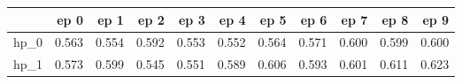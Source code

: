 \begin{tabular}{lrrrrrrrrrr}
\toprule
{} &   ep 0 &   ep 1 &   ep 2 &   ep 3 &   ep 4 &   ep 5 &   ep 6 &   ep 7 &   ep 8 &   ep 9 \\
\midrule
hp\_0 &  0.563 &  0.554 &  0.592 &  0.553 &  0.552 &  0.564 &  0.571 &  0.600 &  0.599 &  0.600 \\
hp\_1 &  0.573 &  0.599 &  0.545 &  0.551 &  0.589 &  0.606 &  0.593 &  0.601 &  0.611 &  0.623 \\
\bottomrule
\end{tabular}
